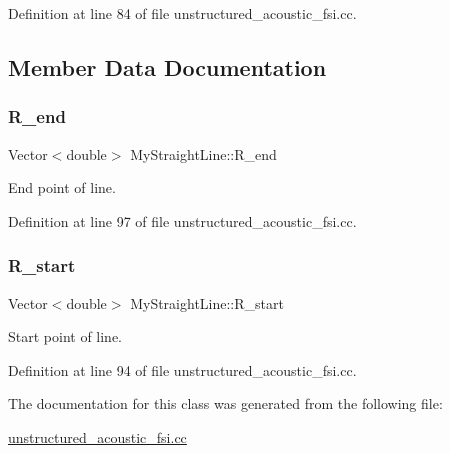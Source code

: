 Definition at line 84 of file unstructured\+\_\+acoustic\+\_\+fsi.\+cc.



\subsection{Member Data Documentation}
\mbox{\label{classMyStraightLine_afa466e12301ccea99a02fe1bde615691}} 
\subsubsection{\texorpdfstring{R\+\_\+end}{R\_end}}
{\footnotesize\ttfamily Vector$<$double$>$ My\+Straight\+Line\+::\+R\+\_\+end\hspace{0.3cm}{\ttfamily [private]}}



End point of line. 



Definition at line 97 of file unstructured\+\_\+acoustic\+\_\+fsi.\+cc.

\mbox{\label{classMyStraightLine_a0f66636dd5d1e7ff6ec93acf90879f0c}} 
\subsubsection{\texorpdfstring{R\+\_\+start}{R\_start}}
{\footnotesize\ttfamily Vector$<$double$>$ My\+Straight\+Line\+::\+R\+\_\+start\hspace{0.3cm}{\ttfamily [private]}}



Start point of line. 



Definition at line 94 of file unstructured\+\_\+acoustic\+\_\+fsi.\+cc.



The documentation for this class was generated from the following file\+:\begin{DoxyCompactItemize}
\item 
\hyperlink{unstructured__acoustic__fsi_8cc}{unstructured\+\_\+acoustic\+\_\+fsi.\+cc}\end{DoxyCompactItemize}
